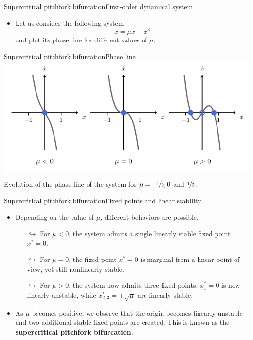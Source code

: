 \documentclass[usenames,dvipsnames,svgnames,10pt,aspectratio=169]{beamer}
\begin{document}
\begin{frame}[t, c]{Supercritical pitchfork bifurcation}{First-order dynamical system}
	\begin{itemize}
		\item Let us consider the following system
		$$\dot{x} = \mu x - x^3$$
		and plot its phase line for different values of $\mu$.
	\end{itemize}

	\vspace{1cm}
\end{frame}

\begin{frame}[t, c]{Supercritical pitchfork bifurcation}{Phase line}
	\centering
	\includegraphics[width=.75\textwidth]{supercritical_pitchfork_phase_line}

	Evolution of the phase line of the system for $\mu = \nicefrac{-1}{2}, 0$ and $\nicefrac{1}{2}$.

	\vspace{1cm}
\end{frame}

\begin{frame}[t, c]{Supercritical pitchfork bifurcation}{Fixed points and linear stability}
	\begin{itemize}
		\item Depending on the value of $\mu$, different behaviors are possible.
		\begin{itemize}
			\item[$\hookrightarrow$] For $\mu<0$, the system admits a single linearly stable fixed point $x^* = 0$.
			\item[$\hookrightarrow$] For $\mu = 0$, the fixed point $x^*=0$ is marginal from a linear point of view, yet still nonlinearly stable.
			\item[$\hookrightarrow$] For $\mu > 0$, the system now admits three fixed points. $x_1^*=0$ is now linearly unstable, while $x^*_{2, 3} = \pm \sqrt{\mu}$ are linearly stable.
		\end{itemize}

		\medskip

		\item As $\mu$ becomes positive, we observe that the origin becomes linearly unstable and two additional stable fixed points are created. This is known as the \alert{\textbf{supercritical pitchfork bifurcation}}.
	\end{itemize}

	\vspace{1cm}
\end{frame}
\end{document}
